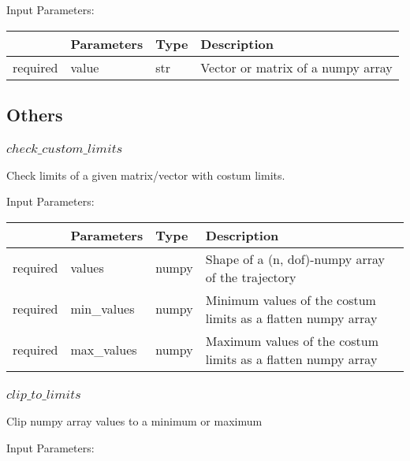 \documentclass[
	ngerman,
	accentcolor=9c,%
	type=intern,
	marginpar=false
	]{tudapub}
\begin{document}
\vspace{0.5cm}
\noindent Input Parameters:
\vspace{0.5cm}

\begin{tabular}{|p{}|p{}|p{}| p{}|}
\hline
 & \textbf{Parameters} & \textbf{Type} & \textbf{Description} \\
\hline
required & value & str & Vector or matrix of a numpy array \\
\hline
\end{tabular}
\vspace{1cm}

\subsection{Others}
\subsubsection{$check\_custom\_limits$}
\noindent Check limits of a given matrix/vector with costum limits.

\vspace{0.5cm}
\noindent Input Parameters:
\vspace{0.5cm}

\begin{tabular}{|p{}|p{}|p{}| p{}|}
\hline
 & \textbf{Parameters} & \textbf{Type} & \textbf{Description} \\
\hline
required & values & numpy & Shape of a (n, dof)-numpy array of the trajectory \\
\hline
required & min\_values & numpy & Minimum values of the costum limits as a flatten numpy array \\
\hline
required & max\_values & numpy & Maximum values of the costum limits as a flatten numpy array\\
\hline
\end{tabular}
\vspace{1cm}


\subsubsection{$clip\_to\_limits$}
\noindent Clip numpy array values to a minimum or maximum


\vspace{0.5cm}
\noindent Input Parameters:
\vspace{0.5cm}
\end{document}

